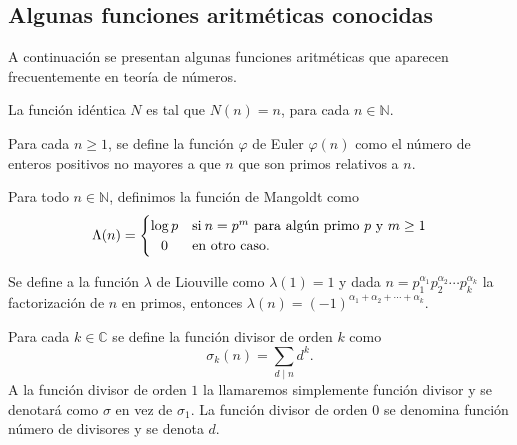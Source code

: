 \newpage
\subsection{Algunas funciones aritméticas conocidas}

A continuación se presentan algunas funciones aritméticas que aparecen frecuentemente en teoría de números.

\begin{definition}
La función idéntica $N$ es tal que $N(n)=n$, para cada $n\in \mathbb{N}$.
\end{definition}

\begin{definition}
Para cada $n\geq 1$, se define la función $\varphi$ de Euler $\varphi(n)$ como el número de enteros positivos no mayores a que $n$ que son primos relativos a $n$.
\end{definition}

\begin{definition}
Para todo $n\in\mathbb{N}$, definimos la función de Mangoldt como 
\begin{equation*}
	\Lambda(n) =
		\begin{cases}
			\log p & \text{si} \: n=p^m \text{ para algún primo } p \text{ y } m\geq 1\\ \hfil
			0 & \text{en otro caso}.
		\end{cases}
\end{equation*}
\end{definition}

\begin{definition}
Se define a la función $\lambda$ de Liouville como $\lambda(1)=1$ y dada $n=p_1^{\alpha_1}p_2^{\alpha_2}\cdots p_k^{\alpha_k}$ la factorización de $n$ en primos, entonces $\lambda(n)=(-1)^{\alpha_1+\alpha_2+\cdots+\alpha_k}$.
\end{definition}

\begin{definition}
Para cada $k\in\mathbb{C}$ se define la función divisor de orden $k$ como 
\begin{equation*}
	\sigma_k(n)=\sum_{d \mid n} d^k.
\end{equation*}
A la función divisor de orden $1$ la llamaremos simplemente función divisor y se denotará como $\sigma$ en vez de $\sigma_1$. La función divisor de orden $0$ se denomina función número de divisores y se denota $d$.
\end{definition}


